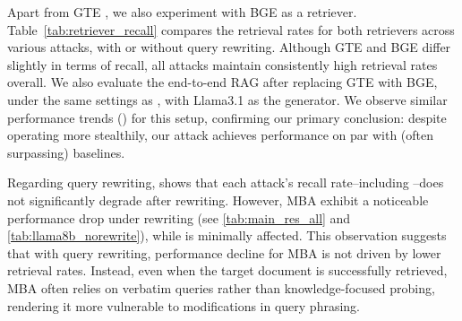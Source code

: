 Apart from GTE \citep{li2023towards}, we also experiment with BGE \citep{li2023towards} as a retriever. Table~\ref{tab:retriever_recall} compares the retrieval rates for both retrievers across various attacks, with or without query rewriting. Although GTE and BGE differ slightly in terms of recall, all attacks maintain consistently high retrieval rates overall. We also evaluate the end-to-end RAG after replacing GTE with BGE, under the same settings as , with Llama3.1 as the generator. We observe similar performance trends () for this setup, confirming our primary conclusion: 
despite operating more stealthily, our attack achieves performance on par with (often surpassing) baselines.

Regarding query rewriting,  shows that each attack’s recall rate--including \ourattack--does not significantly degrade after rewriting. However, MBA exhibit a noticeable performance drop under rewriting (see \cref{tab:main_res_all} and \cref{tab:llama8b_norewrite}), while \ourattack is minimally affected. This observation suggests that with query rewriting, performance decline for MBA is not driven by lower retrieval rates. Instead, even when the target document is successfully retrieved, MBA often relies on verbatim queries rather than knowledge-focused probing, rendering it more vulnerable to modifications in query phrasing.


